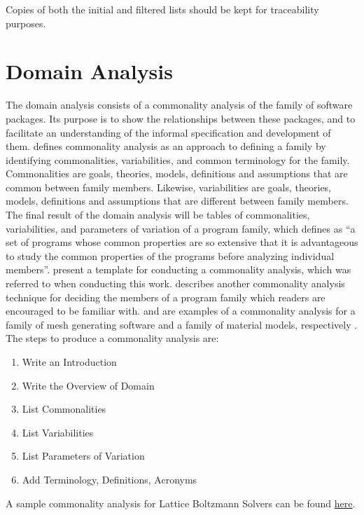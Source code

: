 \documentclass[letterpaper,cleveref]{lipics-v2019}
\theoremstyle{definition}
\begin{document}
Copies of both the initial and filtered lists should be kept for traceability purposes.

\section{Domain Analysis} \label{SecDomainAnalysis}

The domain analysis consists of a commonality analysis of the family of software packages. Its purpose is to show the relationships between these packages, and to facilitate an understanding of the informal specification and development of them. \cite{weiss1997defining} defines commonality analysis as an approach to defining a family by identifying commonalities, variabilities, and common terminology for the family. Commonalities are goals, theories, models, definitions and assumptions that are common between family members. Likewise, variabilities are goals, theories, models, definitions and assumptions that are different between family members. The final result of the domain analysis will be tables of commonalities, variabilities, and parameters of variation of a program family, which \cite{parnas1976design} defines as ``a set of programs whose common properties are so extensive that it is advantageous to study the common properties of the programs before analyzing individual members''. \cite{smith2008commonality} present a template for conducting a commonality analysis, which was referred to when conducting this work. \cite{weiss1998commonality} describes another commonality analysis technique for deciding the members of a program family which readers are encouraged to be familiar with. \cite{SmithAndChen2004} and \cite{SmithMcCutchanAndCarette2017} are examples of a commonality analysis for a family of mesh generating software and a family of material models, respectively . The steps to produce a commonality analysis are:

\begin{enumerate}
\item Write an Introduction
\item Write the Overview of Domain
\item List Commonalities
\item List Variabilities
\item List Parameters of Variation
\item Add Terminology, Definitions, Acronyms
\end{enumerate}

A sample commonality analysis for Lattice Boltzmann Solvers can be found
\href{https://github.com/smiths/AIMSS/blob/master/StateOfPractice/Peter-Notes/Commonality-Analysis-LB-Systems.pdf}{here}.
\end{document}
